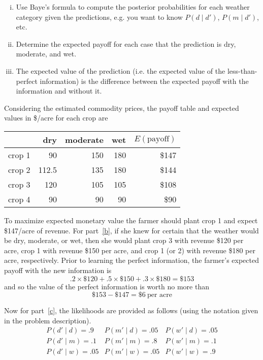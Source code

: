 \begin{enumerate}
\begin{enumerate}
\begin{enumerate}[i)]
\item Use Baye's formula to compute the posterior probabilities for
  each weather category given the predictions, e.g. you want to know
  $P(d \mid d')$, $P(m \mid d')$, etc.

\item Determine the expected payoff for each case that the prediction is
dry, moderate, and wet.

\item The expected value of the prediction (i.e. the expected value of the
less-than-perfect information) is the difference between the expected payoff
with the information and without it.
\end{enumerate}

\end{enumerate}

\begin{solution}
\bs Considering the estimated commodity prices, the payoff table and expected
values in \$/acre for each crop are

\begin{center}
\begin{tabular}{lrrrr}
& dry & moderate & wet & $E(\text{payoff})$ \\ \hline
crop 1 & 90 & 150 & 180 & \$147 \\
crop 2 & 112.5 & 135 & 180 & \$144 \\
crop 3 & 120 & 105 & 105 & \$108 \\
crop 4 & 90 & 90 & 90 & \$90 
\end{tabular}
\end{center}

To maximize expected monetary value the farmer should plant crop 1 and
expect \$147/acre of revenue. For part~\ref{b}, if she knew for
certain that the weather would be dry, moderate, or wet, then she
would plant crop 3 with revenue \$120 per acre, crop 1 with revenue
\$150 per acre, and crop 1 (or 2) with revenue \$180 per acre,
respectively. Prior to learning the perfect information, the farmer's
expected payoff with the new information is
\[
.2 \times \$120 + .5 \times \$150 + .3 \times \$180 = \$153
\]
and so the value of the perfect information is worth no more than
\[
\$153 - \$147 = \$6~\text{per acre}
\]

Now for part~\ref{c}, the likelihoods are provided as follows
(using the notation given in the problem description).
\[
\begin{matrix}
P(d' \mid d)=.9 & P(m' \mid d)=.05 & P(w' \mid d)=.05 \\
P(d' \mid m)=.1 & P(m' \mid m)=.8 & P(w' \mid m)=.1 \\
P(d' \mid w)=.05 & P(m' \mid w)=.05 & P(w' \mid w)=.9 \\
\end{matrix}
\]


\end{solution}
\end{enumerate}
